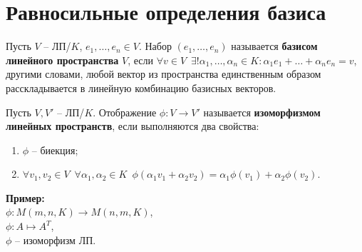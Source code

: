 
\section{Равносильные определения базиса}

\begin{conj}
    Пусть $V$ -- ЛП/$K$, $e_1, \dots, e_n \in V$.
    Набор $(e_1, \dots, e_n)$ называется \textbf{базисом линейного 
    пространства} $V$, если $\forall v \in V \,\,\, \exists! \alpha_1,
    \dots, \alpha_n \in K : \alpha_1 e_1 + \dots + \alpha_n e_n = v$,
    другими словами, любой вектор из пространства единственным образом
    расскладывается в линейную комбинацию базисных векторов.
\end{conj}

\begin{conj}
    Пусть $V, V'$ -- ЛП/$K$. Отображение $\phi : V \to V'$
    называется \textbf{изоморфизмом линейных пространств}, если
    выполняются два свойства:
    \begin{enumerate}
        \item $\phi$ -- биекция;
        \item $\forall v_1, v_2 \in V \,\,\, \forall \alpha_1, \alpha_2
        \in K \,\,\, \phi(\alpha_1 v_1 + \alpha_2 v_2) = \alpha_1
        \phi (v_1) + \alpha_2 \phi(v_2)$.
    \end{enumerate}
\end{conj}

$ $\\
\textbf{Пример:}\\
$\phi : M(m, n, K) \to M(n, m, K)$,\\
$\phi : A \mapsto A^T$, \\
$\phi$ -- изоморфизм ЛП.

\

